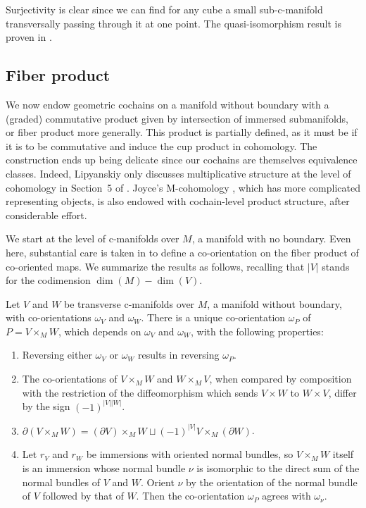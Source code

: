 Surjectivity is clear since we can find for any cube a small sub-c-manifold transversally passing through it at one point.
The quasi-isomorphism result is proven in \cite[Theorem 6.21]{medina2022foundations}.

\subsection{Fiber product}\label{S:fiber product section}

We now endow geometric cochains on a manifold without boundary with a (graded) commutative product given by intersection of immersed submanifolds, or fiber product more generally.
This product is partially defined, as it must be if it is to be commutative and induce the cup product in cohomology.
The construction ends up being delicate since our cochains are themselves equivalence classes.
Indeed, Lipyanskiy only discusses multiplicative structure at the level of cohomology in Section~5 of \cite{Lipy14}.
Joyce's M-cohomology \cite{Joyc15}, which has more complicated representing objects, is also endowed with cochain-level product structure, after considerable effort.

We start at the level of c-manifolds over $M$, a manifold with no boundary.
Even here, substantial care is taken in \cite[Section 3.5.2]{medina2022foundations} to define a co-orientation on the fiber product of co-oriented maps.
We summarize the results as follows, recalling that $|V|$ stands for the codimension $\dim(M)-\dim(V)$.

\begin{theorem}\label{T:pull-back co-or}
	Let $V$ and $W$ be transverse c-manifolds over $M$, a manifold without boundary,
	with co-orientations $\omega_V$ and $\omega_W$.
	There is a unique co-orientation $\omega_P$ of $P = V \times_M W$, which depends on $\omega_V$ and $\omega_W$, with the following properties:
	\begin{enumerate}
		\item Reversing either $\omega_V$ or $\omega_W$ results in reversing $\omega_P$.
		\item The co-orientations of $V \times_M W$ and $W \times_M V$, when compared by composition with the restriction of the diffeomorphism which sends
		$V \times W$ to $W \times V$, differ by the sign $(-1)^{|V||W|}$.
		\item $\partial ( V \times_M W) = (\partial V) \times_M W \sqcup (-1)^{|V|} V \times_M (\partial W)$.
		\item Let $r_V$ and $r_W$ be immersions with oriented normal bundles, so $V \times_M W$ itself is an immersion whose
		normal bundle $\nu$ is isomorphic to the direct sum of the normal bundles of $V$ and $W$.
		Orient $\nu$ by the orientation of the normal bundle of $V$ followed by that of $W$.
		Then the co-orientation $\omega_P$ agrees with $\omega_{\nu}$.
	\end{enumerate}
\end{theorem}

